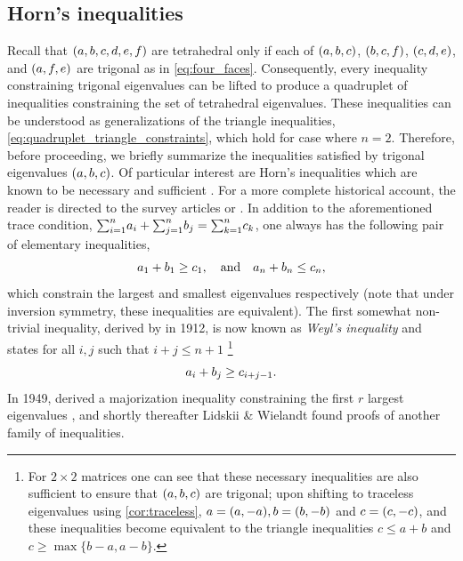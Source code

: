 \documentclass[notitlepage, 10pt]{article}
\begin{document}
\subsection{Horn's inequalities}
Recall that $(a,b,c,d,e,f)$ are tetrahedral only if each of $(a,b,c)$, $(b, c, f)$, $(c,d,e)$, and $(a,f,e)$ are trigonal as in \cref{eq:four_faces}.
Consequently, every inequality constraining trigonal eigenvalues can be lifted to produce a quadruplet of inequalities constraining the set of tetrahedral eigenvalues.
These inequalities can be understood as generalizations of the triangle inequalities, \cref{eq:quadruplet_triangle_constraints}, which hold for case where $n=2$.
Therefore, before proceeding, we briefly summarize the inequalities satisfied by trigonal eigenvalues $(a,b,c)$.
Of particular interest are Horn's inequalities \cite{horn1962eigenvalues} which are known to be necessary and sufficient \cite{klyachko1998stable,knutson1999honeycomb}.
For a more complete historical account, the reader is directed to the survey articles \cite{bhatia2001linear,fulton1998eigenvalues,knutson2000symplectic} or \cite[Appendix D]{niculescu2006convex}.
In addition to the aforementioned trace condition, ${\sum}_{i=1}^{n}a_i + {\sum}_{j=1}^{n}b_j = {\sum}_{k=1}^{n}c_k$, one always has the following pair of elementary inequalities,
\begin{equation}
    a_1 + b_1 \geq c_1, \quad \text{and} \quad a_n + b_n \leq c_n,
\end{equation}
which constrain the largest and smallest eigenvalues respectively (note that under inversion symmetry, these inequalities are equivalent).
The first somewhat non-trivial inequality, derived by \citeauthor{weyl1912asymptotische} in 1912, is now known as \textit{Weyl's inequality} and states for all $i,j$ such that $i+j \leq n+1$ \cite{weyl1912asymptotische}\footnote{For $2\times 2$ matrices one can see that these necessary inequalities are also sufficient to ensure that $(a,b,c)$ are trigonal; upon shifting to traceless eigenvalues using \cref{cor:traceless}, $a = (a,-a), b = (b, -b)$ and $c = (c,-c)$, and these inequalities become equivalent to the triangle inequalities $c \leq a+b$ and $c \geq \max\{b-a,a-b\}$.}
\begin{equation}
    a_i + b_j \geq c_{i+j-1}.
\end{equation}
In 1949, \citeauthor{fan1949theorem} derived a majorization inequality constraining the first $r$ largest eigenvalues \cite{fan1949theorem},
and shortly thereafter Lidskii \cite{lidskii1953proper} \& Wielandt \cite{wielandt1955extremum} found proofs of another family of inequalities.
\end{document}
